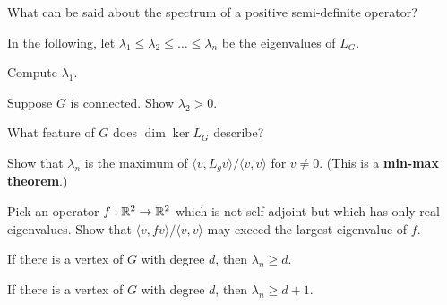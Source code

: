 \documentclass{homework}
\begin{document}
\vfill

\begin{problem}
  What can be said about the spectrum of a positive semi-definite operator?
\end{problem}

\vfill

In the following, let
$\lambda_1 \leq \lambda_2 \leq \ldots \leq \lambda_n$ be the
eigenvalues of $L_G$.

\begin{problem}
  Compute $\lambda_1$.
\end{problem}

\vfill

\begin{problem}
  Suppose $G$ is connected.  Show $\lambda_2 > 0$.
\end{problem}

\vfill

\begin{problem}
  What feature of $G$ does $\dim \ker L_G$ describe?
\end{problem}

\vfill

\begin{problem}
  Show that $\lambda_n$ is the maximum of $\langle v, L_g v \rangle / \langle v, v \rangle$ for $v \neq 0$.  (This is a \textbf{min-max theorem}.)
\end{problem}

\vfill

\begin{problem}
  Pick an operator $f : \mathbb{R}^2 \to \mathbb{R}^2$ which is not self-adjoint but which has only real eigenvalues.  Show that $\langle v, f v \rangle / \langle v, v \rangle$ may exceed the largest eigenvalue of $f$.
\end{problem}

\vfill

\begin{problem}
  If there is a vertex of $G$ with degree $d$, then $\lambda_n \geq d$.
\end{problem}

\vfill

\begin{problem}
  If there is a vertex of $G$ with degree $d$, then $\lambda_n \geq d + 1$.
\end{problem}

\vfill
\end{document}

